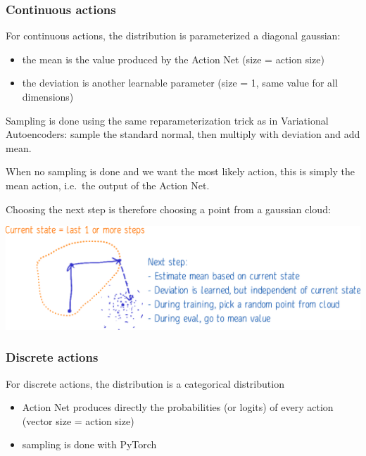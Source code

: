 \documentclass[
  letterpaper,
  DIV=11,
  numbers=noendperiod]{scrartcl}
\providecommand{\tightlist}{%
  \setlength{\itemsep}{0pt}\setlength{\parskip}{0pt}}\usepackage{longtable,booktabs,array}
\begin{document}
\hypertarget{continuous-actions}{%
\subsubsection{Continuous actions}\label{continuous-actions}}

For continuous actions, the distribution is parameterized a diagonal
gaussian:

\begin{itemize}
\tightlist
\item
  the mean is the value produced by the Action Net (size = action size)
\item
  the deviation is another learnable parameter (size = 1, same value for
  all dimensions)
\end{itemize}

Sampling is done using the same reparameterization trick as in
Variational Autoencoders: sample the standard normal, then multiply with
deviation and add mean.

When no sampling is done and we want the most likely action, this is
simply the mean action, i.e.~the output of the Action Net.

Choosing the next step is therefore choosing a point from a gaussian
cloud:

\hfill\break

\includegraphics{img/Explanation.png}

\hypertarget{discrete-actions}{%
\subsubsection{Discrete actions}\label{discrete-actions}}

For discrete actions, the distribution is a categorical distribution

\begin{itemize}
\tightlist
\item
  Action Net produces directly the probabilities (or logits) of every
  action (vector size = action size)
\item
  sampling is done with PyTorch
\end{itemize}
\end{document}
